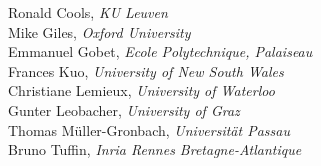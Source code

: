 Ronald Cools, \emph{KU Leuven} \\
Mike Giles, \emph{Oxford University} \\
Emmanuel Gobet, \emph{Ecole Polytechnique, Palaiseau} \\
Frances Kuo, \emph{University of New South Wales} \\
Christiane Lemieux, \emph{University of Waterloo} \\
Gunter Leobacher, \emph{University of Graz} \\
Thomas Müller-Gronbach, \emph{Universität Passau} \\
Bruno Tuffin, \emph{Inria Rennes Bretagne-Atlantique}